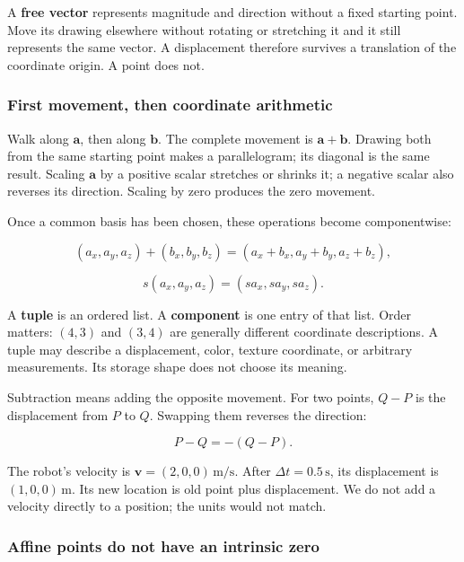 A \textbf{free vector} represents magnitude and direction without a fixed starting point. Move its drawing elsewhere without rotating or stretching it and it still represents the same vector. A displacement therefore survives a translation of the coordinate origin. A point does not.

\subsubsection{First movement, then coordinate arithmetic}\label{01-foundations-i-ch017-first-movement-then-coordinate-arithmetic}

\hypertarget{01-foundations-i-ch017-first-movement-then-coordinate-arithmetic}{}

Walk along \(\mathbf a\), then along \(\mathbf b\). The complete movement is \(\mathbf a+\mathbf b\). Drawing both from the same starting point makes a parallelogram; its diagonal is the same result. Scaling \(\mathbf a\) by a positive scalar stretches or shrinks it; a negative scalar also reverses its direction. Scaling by zero produces the zero movement.

Once a common basis has been chosen, these operations become componentwise:

\[
(a_x,a_y,a_z)+(b_x,b_y,b_z)
=(a_x+b_x,a_y+b_y,a_z+b_z),
\]

\[
s(a_x,a_y,a_z)=(sa_x,sa_y,sa_z).
\]

A \textbf{tuple} is an ordered list. A \textbf{component} is one entry of that list. Order matters: \((4,3)\) and \((3,4)\) are generally different coordinate descriptions. A tuple may describe a displacement, color, texture coordinate, or arbitrary measurements. Its storage shape does not choose its meaning.

Subtraction means adding the opposite movement. For two points, \(Q-P\) is the displacement from \(P\) to \(Q\). Swapping them reverses the direction:

\[
P-Q=-(Q-P).
\]

The robot's velocity is \(\mathbf v=(2,0,0)\,\mathrm{m/s}\). After \(\Delta t=0.5\,\mathrm s\), its displacement is \((1,0,0)\,\mathrm m\). Its new location is old point plus displacement. We do not add a velocity directly to a position; the units would not match.

\subsubsection{Affine points do not have an intrinsic zero}\label{01-foundations-i-ch017-affine-points-do-not-have-an-intrinsic-zero}

